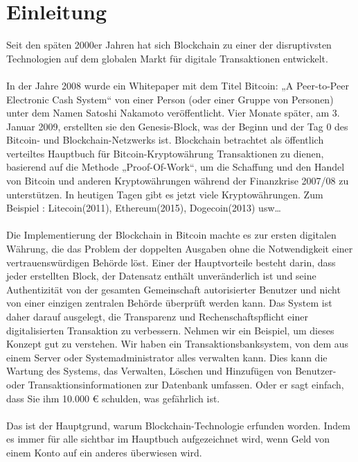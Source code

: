 \documentclass[ngerman]{scrreprt}
\begin{document}
  \tableofcontents


\chapter{Einleitung}
Seit den späten 2000er Jahren hat sich Blockchain zu einer der disruptivsten Technologien auf dem globalen Markt für digitale Transaktionen entwickelt.\\ \\
In der Jahre 2008 wurde ein Whitepaper mit dem Titel Bitcoin: „A Peer-to-Peer Electronic Cash System“ von einer Person (oder einer Gruppe von Personen) unter dem Namen Satoshi Nakamoto veröffentlicht. Vier Monate später, am 3. Januar 2009, erstellten sie den Genesis-Block, was der Beginn und der Tag 0 des Bitcoin- und Blockchain-Netzwerks ist. Blockchain betrachtet als öffentlich verteiltes Hauptbuch für Bitcoin-Kryptowährung Transaktionen zu dienen, basierend auf die Methode „Proof-Of-Work“, um die Schaffung und den Handel von Bitcoin und anderen Kryptowährungen während der Finanzkrise 2007/08 zu unterstützen. In heutigen Tagen gibt es jetzt viele Kryptowährungen. Zum Beispiel : Litecoin(2011), Ethereum(2015), Dogecoin(2013) usw… \\ \\
Die Implementierung der Blockchain in Bitcoin machte es zur ersten digitalen Währung, die das Problem der doppelten Ausgaben ohne die Notwendigkeit einer vertrauenswürdigen Behörde löst. Einer der Hauptvorteile besteht darin, dass jeder erstellten Block, der Datensatz enthält unveränderlich ist und seine Authentizität von der gesamten Gemeinschaft autorisierter Benutzer und nicht von einer einzigen zentralen Behörde überprüft werden kann. Das System ist daher darauf ausgelegt, die Transparenz und Rechenschaftspflicht einer digitalisierten Transaktion zu verbessern. Nehmen wir ein Beispiel, um dieses Konzept gut zu verstehen. Wir haben ein Transaktionsbanksystem, von dem aus einem Server oder Systemadministrator alles verwalten kann. Dies kann die Wartung des Systems, das Verwalten, Löschen und Hinzufügen von Benutzer- oder Transaktionsinformationen zur Datenbank umfassen. Oder er sagt einfach, dass Sie ihm 10.000 € schulden, was gefährlich ist. \\ \\
Das ist der Hauptgrund, warum Blockchain-Technologie erfunden worden. Indem es immer für alle sichtbar im Hauptbuch aufgezeichnet wird, wenn Geld von einem Konto auf ein anderes überwiesen wird.
\end{document}
